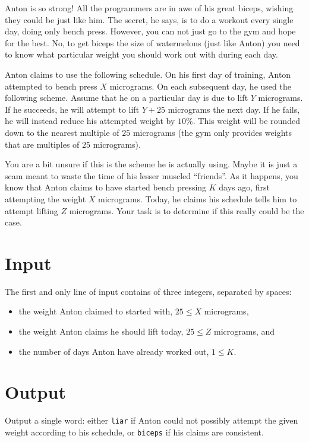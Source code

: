 Anton is so strong!
All the programmers are in awe of his great biceps, wishing they could be just like him.
The secret, he says, is to do a workout every single day, doing only bench press.
However, you can not just go to the gym and hope for the best.
No, to get biceps the size of watermelons (just like Anton) you need to know what particular weight you should work out with during each day.

Anton claims to use the following schedule.
On his first day of training, Anton attempted to bench press $X$ micrograms.
On each subsequent day, he used the following scheme.
Assume that he on a particular day is due to lift $Y$ micrograms.
If he succeeds, he will attempt to lift $Y + 25$ micrograms the next day.
If he fails, he will instead reduce his attempted weight by $10\%$.
This weight will be rounded down to the nearest multiple of $25$ micrograms (the gym only provides weights that are multiples of $25$ micrograms).

You are a bit unsure if this is the scheme he is actually using.
Maybe it is just a scam meant to waste the time of his lesser muscled ``friends''.
As it happens, you know that Anton claims to have started bench pressing $K$ days ago, first attempting the weight $X$ micrograms.
Today, he claims his schedule tells him to attempt lifting $Z$ micrograms.
Your task is to determine if this really could be the case.

\section*{Input}
The first and only line of input contains of three integers, separated by spaces:
\begin{itemize}
\item the weight Anton claimed to started with, $25 \le X$ micrograms,
\item the weight Anton claims he should lift today, $25 \le Z$ micrograms, and
\item the number of days Anton have already worked out, $1 \le K$.
\end{itemize}

\section*{Output}
Output a single word: either \texttt{liar} if Anton could not possibly attempt the given weight according to his schedule, or \texttt{biceps} if his claims are consistent.

